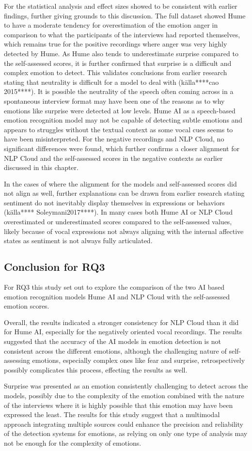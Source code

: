 For the statistical analysis and effect sizes showed to be consistent with earlier findings, further giving grounds to this discussion. 
The full dataset showed Hume to have a moderate tendency for overestimation of the emotion anger in comparison to what the participants of the interviews had reported themselves, which remains true for the positive recordings where anger was very highly detected by Hume. As Hume also tends to underestimate surprise compared to the self-assessed scores, it is further confirmed that surprise is a difficult and complex emotion to detect. This validates conclusions from earlier research stating that neutrality is difficult for a model to deal with (källa****cao 2015****). It is possible the neutrality of the speech often coming across in a spontaneous interview format may have been one of the reasons as to why emotions like surprise were detected at low levels. Hume AI as a speech-based emotion recognition model may not be capable of detecting subtle emotions and appears to struggles without the textual context as some vocal cues seems to have been misinterpreted.
For the negative recordings and NLP Cloud, no significant differences were found, which further confirms a closer alignment for NLP Cloud and the self-assessed scores in the negative contexts as earlier discussed in this chapter.

In the cases of where the alignment for the models and self-assessed scores did not align as well, further explanations can be drawn from earlier research stating sentiment do not inevitably display themselves in expressions or behaviors (källa**** Soleymani2017****). In many cases both Hume AI or NLP Cloud overestimated or underestimated scores compared to the self-assessed values, likely because of vocal expressions not always aligning with the internal affective states as sentiment is not always fully articulated. 

\subsection{Conclusion for RQ3}
For RQ3 this study set out to explore the comparison of the two AI based emotion recognition models Hume AI and NLP Cloud with the self-assessed emotion scores. 

Overall, the results indicated a stronger consistency for NLP Cloud than it did for Hume AI, especially for the negatively oriented vocal recordings. The results suggested that the accuracy of the AI models in emotion detection is not consistent across the different emotions, although the challenging nature of self-assessing emotions, especially complex ones like fear and surprise, retrospectively possibly complicates this process, effecting the results as well.

Surprise was presented as an emotion consistently challenging to detect across the models, possibly due to the complexity of the emotion combined with the nature of the interviews where it is highly possible that this emotion may have been expressed the least.
The results for this study suggest that a multimodal approach integrating multiple sources could enhance the precision and reliability of the detection systems for emotions, as relying on only one type of analysis may not be enough for the complexity of emotions.
